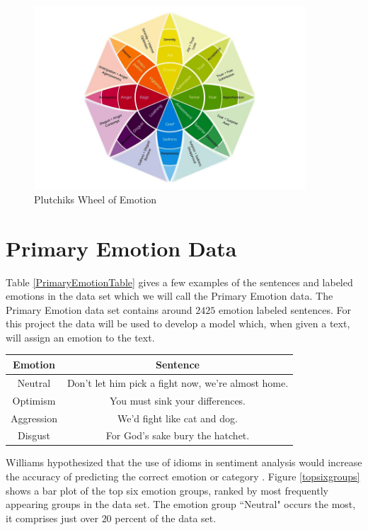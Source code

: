 \documentclass[titlepage,letterpaper]{article}
\begin{document}
\begin{figure}[ht]
	\center
	\includegraphics[width=4in]{PlutchikWheelOfEmotion.jpg}
	\caption{Plutchiks Wheel of Emotion \cite{WheelofEmotion}}
	\label{plutchikemotionwheel}
\end{figure}

\section{Primary Emotion Data}
Table \ref{PrimaryEmotionTable} gives a few examples of the sentences and labeled emotions in the data set which we will call the Primary Emotion data. The Primary Emotion data set contains around $2425$ emotion labeled sentences. For this project the data will be used to develop a model which, when given a text, will assign an emotion to the text. 
 
 \begin{center}
 	\begin{tabular}{ |c|c| } 
 		\hline
 		Emotion & Sentence \\
 		\hline \hline
 		Neutral & Don't let him pick a fight now, we're almost home. \\
 		\hline
 		Optimism &  You must sink your differences. \\
 		\hline
 		Aggression & We'd fight like cat and dog.  \\ 
 		\hline
 		Disgust & For God's sake bury the hatchet. \\
 		\hline
 	\end{tabular}
 	\label{PrimaryEmotionTable}
 \end{center}

 
 Williams hypothesized that the use of idioms in sentiment analysis would increase the accuracy of predicting the correct emotion or category \cite{lowriwilliams}. Figure \ref{topsixgroups} shows a bar plot of the top six emotion groups, ranked by most frequently appearing groups in the data set. The emotion group ``Neutral" occurs the most, it comprises just over $20$ percent of the data set. 
 
\end{document}
